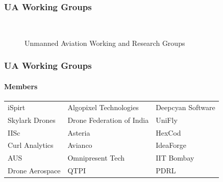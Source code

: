 \documentclass[usenames,dvipsnames,aspectratio=169,serif]{beamer}
\begin{document}
\begin{frame}
   \frametitle{UA Working Groups}
   \begin{figure}[tbh]
      \begin{centering}
         \begin{center}
            \small\tt
            \hfil
         \hfil \end{center}
      \par\end{centering}
      \caption{Unmanned Aviation Working and Research Groups}
   \end{figure}
\end{frame}


\begin{frame}
   \frametitle{UA Working Groups}
   \framesubtitle{Members}
   \begin{table}\small\ttfamily
      \begin{tabular}{ l | l | l }
         iSpirt & Algopixel Technologies\footnotemark & Deepcyan Software\footnotemark[\value{footnote}] \\
         Skylark Drones\footnotemark[\value{footnote}] & Drone Federation of India\footnotemark[\value{footnote}] & UniFly\footnotemark[\value{footnote}] \\
         IISc & Asteria & HexCod \\
         Curl Analytics & Avianco\footnotemark[\value{footnote}] & IdeaForge \\
         AUS & Omnipresent Tech & IIT Bombay \\
         Drone Aerospace & QTPI & PDRL\footnotemark[\value{footnote}] \\
      \end{tabular}
   \end{table}
\end{frame}
\end{document}
